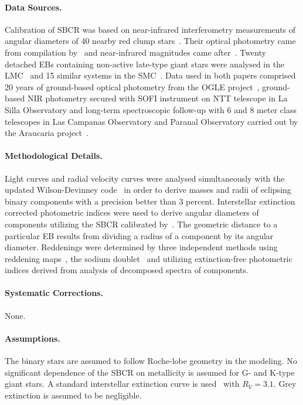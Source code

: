 \paragraph{Data Sources.}
Calibration of SBCR was based on near-infrared interferometry measurements of angular diameters of 40 nearby red clump stars~\citep{2019A&A...632A..31G}. Their optical photometry came from compilation by~\citep{1997A&AS..124..349M} and near-infrared magnitudes came after~\citep{2012MNRAS.419.1637L}. Twenty detached EBs containing non-active late-type giant stars were analysed in the LMC~\citep{2018ApJ...860....1G} and 15 similar systems in the SMC~\citep{2020ApJ...904...13G}. Data used in both papers comprised 20 years of ground-based optical photometry from the OGLE project~\citep{1997AcA....47..319U}, ground-based NIR photometry secured with SOFI instrument on NTT telescope in La Silla Observatory and long-term spectroscopic follow-up with 6 and 8 meter class telescopes in Las Campanas Observatory and Paranal Observatory carried out by the Araucaria project~\citep[e.g.][]{2009ApJ...697..862P}.

\paragraph{Methodological Details.}
Light curves and radial velocity curves were analysed simultaneously with the updated Wilson-Devinney code~\citep{1971ApJ...166..605W} in order to derive masses and radii of eclipsing binary components with a precision better than 3 
percent. Interstellar extinction corrected  photometric indices were used to derive angular diameters of components utilizing the SBCR calibrated by~\citep{2019Natur.567..200P}. The geometric distance to a particular EB results from dividing a radius of a component by its angular diameter. Reddenings were determined by three independent methods using reddening maps~\citep{1998ApJ...500..525S,2011AJ....141..158H}, the sodium doublet~\citep{1997A&A...318..269M} and utilizing extinction-free photometric indices derived from analysis of decomposed spectra of components. 

\paragraph{Systematic Corrections.}
None.

\paragraph{Assumptions.}
The binary stars are assumed to follow Roche-lobe geometry in the modeling. No significant dependence of the SBCR on metallicity is assumed for G- and K-type giant stars. A standard interstellar extinction curve is used~\citep{2007ApJ...663..320F} with $R_V = 3.1$. Grey extinction is assumed to be negligible.

